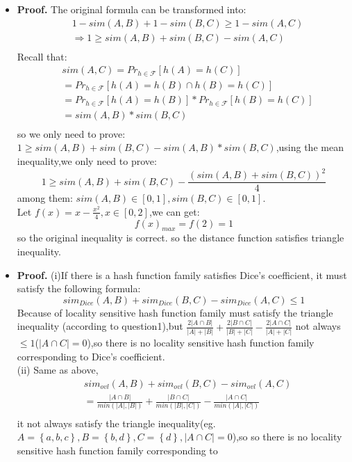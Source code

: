 \documentclass{article}
\begin{document}
\begin{itemize}
    \item \textbf{Proof.} The original formula can be transformed into:$$
    \begin{aligned}
        &1 - sim(A,B) + 1 - sim(B,C) \geq 1 - sim(A,C)\\
        &\Rightarrow 1 \geq sim(A,B) + sim(B,C) - sim(A,C)\\
    \end{aligned}$$
    Recall that:\\$$
    \begin{aligned}
        &sim(A,C) = Pr_{h \in \mathcal{F}}[h(A) = h(C)]\\
        &=Pr_{h \in \mathcal{F}}[h(A) = h(B) \cap h(B) = h(C)]\\
        &=Pr_{h \in \mathcal{F}}[h(A) = h(B)] * Pr_{h \in \mathcal{F}}[h(B) = h(C)]\\
        &=sim(A,B) * sim(B,C)\\ 
    \end{aligned}$$
    so we only need to prove:$1 \geq sim(A,B) + sim(B,C) -sim(A,B)*sim(B,C)$,using the mean inequality,we only need to prove:$$
    1 \geq sim(A,B) + sim(B,C) - \frac{(sim(A,B) + sim(B,C))^2}{4}$$among them:
    $sim(A,B) \in [0,1], sim(B,C) \in [0,1]$.\\Let $f(x) = x - \frac{x^2}{4}, x \in [0,2]$,we can get:$$
    f(x)_{max} = f(2) = 1$$so the original inequality is correct. so the distance function satisfies triangle inequality.\\
    \item \textbf{Proof.} (i)If there is a hash function family satisfies Dice's coefficient, it must satisfy the following formula:$$
    sim_{Dice}(A,B) + sim_{Dice}(B,C) - sim_{Dice}(A,C) \leq 1$$Because of  locality sensitive hash function family must satisfy the triangle inequality
    (according to question1),but $\frac{2|A \cap B|}{|A| + |B|} + \frac{2|B \cap C|}{|B| + |C|} - \frac{2|A \cap C|}{|A| + |C|}$ not always $\leq1$($|A \cap C| = 0$),so there is no locality sensitive hash function family corresponding to Dice's
    coefficient.\\
    (ii) Same as above, $$\begin{aligned}
        &sim_{ovl}(A,B) + sim_{ovl}(B,C) - sim_{ovl}(A,C)\\
        &=\frac{|A \cap B|}{min(|A|,|B|)} + \frac{|B \cap C|}{min(|B|,|C|)} - \frac{|A \cap C|}{min(|A|,|C|)}\\
    \end{aligned}$$it not always satisfy the triangle inequality(eg.$A = \left\{a,b,c\right\},B = \left\{b,d\right\},C=\left\{d\right\},|A \cap C| = 0$),so so there is no locality sensitive hash function family corresponding to

\end{itemize}
\end{document}
